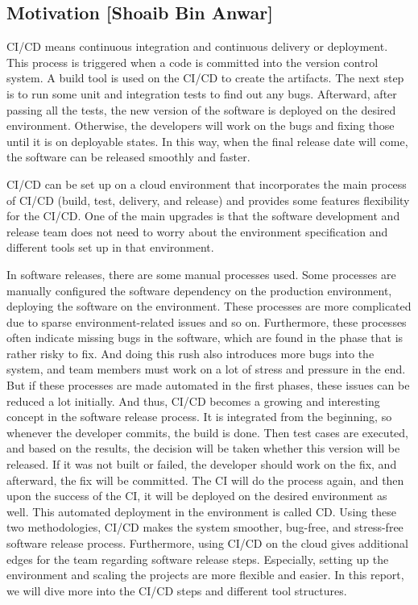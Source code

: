 
\subsection{Motivation [Shoaib Bin Anwar]}
CI/CD means continuous integration and continuous delivery or deployment. This process is triggered when a code is committed into the version control system. A build tool is used on the CI/CD to create the artifacts. The next step is to run some unit and integration tests to find out any bugs. Afterward, after passing all the tests, the new version of the software is deployed on the desired environment. Otherwise, the developers will work on the bugs and fixing those until it is on deployable states. In this way, when the final release date will come, the software can be released smoothly and faster.

CI/CD can be set up on a cloud environment that incorporates the main process of CI/CD (build, test, delivery, and release) and provides some features flexibility for the CI/CD. One of the main upgrades is that the software development and release team does not need to worry about the environment specification and different tools set up in that environment.

In software releases, there are some manual processes used. Some processes are manually configured the software dependency on the production environment, deploying the software on the environment. These processes are more complicated due to sparse environment-related issues and so on. Furthermore, these processes often indicate missing bugs in the software, which are found in the phase that is rather risky to fix. And doing this rush also introduces more bugs into the system, and team members must work on a lot of stress and pressure in the end. But if these processes are made automated in the first phases, these issues can be reduced a lot initially. And thus, CI/CD becomes a growing and interesting concept in the software release process. It is integrated from the beginning, so whenever the developer commits, the build is done. Then test cases are executed, and based on the results, the decision will be taken whether this version will be released. If it was not built or failed, the developer should work on the fix, and afterward, the fix will be committed. The CI will do the process again, and then upon the success of the CI, it will be deployed on the desired environment as well. This automated deployment in the environment is called CD. Using these two methodologies, CI/CD makes the system smoother, bug-free, and stress-free software release process.
Furthermore, using CI/CD on the cloud gives additional edges for the team regarding software release steps. Especially, setting up the environment and scaling the projects are more flexible and easier. In this report, we will dive more into the CI/CD steps and different tool structures.

